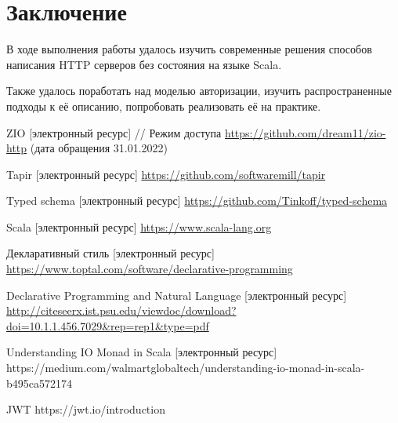 \documentclass[14pt]{extarticle}
\begin{document}
    \section{Заключение}

    В ходе выполнения работы удалось изучить современные решения способов написания HTTP серверов без состояния на
    языке Scala.

    Также удалось поработать над моделью авторизации, изучить распространенные подходы к её описанию, попробовать
    реализовать её на практике.

    \begin{thebibliography}{99}
        ZIO [электронный ресурс] // Режим доступа \url{https://github.com/dream11/zio-http} (дата обращения 31.01.2022)

        Tapir [электронный ресурс] \url{https://github.com/softwaremill/tapir}

        Typed schema [электронный ресурс] \url{https://github.com/Tinkoff/typed-schema}

        Scala [электронный ресурс] \url{https://www.scala-lang.org}
        
        Декларативный стиль [электронный ресурс] \url{https://www.toptal.com/software/declarative-programming}

        Declarative Programming and Natural Language [электронный ресурс] \url{http://citeseerx.ist.psu.edu/viewdoc/download?doi=10.1.1.456.7029&rep=rep1&type=pdf}

        Understanding IO Monad in Scala [электронный ресурс]
        https://medium.com/walmartglobaltech/understanding-io-monad-in-scala-b495ca572174

        JWT
        https://jwt.io/introduction

    \end{thebibliography}
\end{document}
